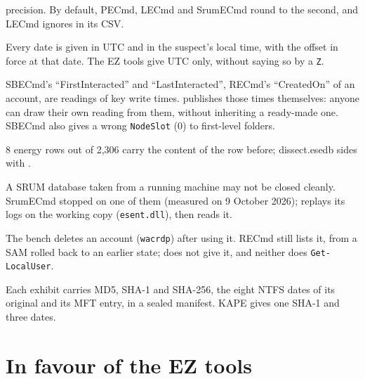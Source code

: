 \documentclass[11pt,a4paper,oneside]{report}
\begin{document}
\begin{description}[style=nextline,leftmargin=1em]
        precision. By default, PECmd, LECmd and SrumECmd round to the second, and
        LECmd ignores  in its CSV.
  \item[Dated local time] Every date is given in UTC and in the suspect's local
        time, with the offset in force at that date. The EZ tools give UTC only,
        without saying so by a \texttt{Z}.
  \item[Others' readings checked] SBECmd's ``FirstInteracted'' and
        ``LastInteracted'', RECmd's ``CreatedOn'' of an account, are readings of
        key write times. \wac{} publishes those times themselves: anyone can draw
        their own reading from them, without inheriting a ready-made one.
        SBECmd also gives a wrong \texttt{NodeSlot} (0) to first-level folders.
  \item[SrumECmd's ESE reading errors] 8 energy rows out of 2,306 carry the
        content of the row before; dissect.esedb sides with \wac{}.
  \item[ESE database not closed cleanly] A SRUM database taken from a running
        machine may not be closed cleanly. SrumECmd stopped on one of them
        (measured on 9 October 2026); \wac{} replays its
        logs on the working copy (\texttt{esent.dll}), then reads it.
  \item[Deleted accounts] The bench deletes an account (\texttt{wacrdp}) after
        using it. RECmd still lists it, from a SAM rolled back to an earlier
        state; \wac{} does not give it, and neither does \texttt{Get-LocalUser}.
  \item[Collection] Each \wac{} exhibit carries MD5, SHA-1 and SHA-256, the
        eight NTFS dates of its original and its MFT entry, in a sealed manifest.
        KAPE gives one SHA-1 and three dates.
\end{description}

\section{In favour of the EZ tools}\label{sec:coverage}
\end{document}
